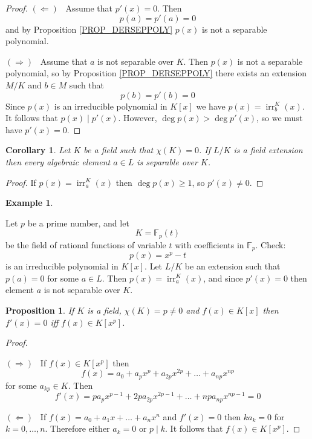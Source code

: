 \documentclass[12pt, letterpaper, oneside]{article}
\theoremstyle{plain}
\newtheorem{proposition}[theorem]{Proposition}
\newtheorem{corollary}[theorem]{Corollary}
\theoremstyle{definition}
\newtheorem{example}[theorem]{Example}
\newcommand{\F}{{\mathbb F}}
\newcommand{\irr}{\operatorname{irr}}
\newcommand{\vs}{\vskip 5mm}
\begin{document}
\vs


\begin{proof}
$(\Leftarrow)$ \  Assume that $p'(x) = 0$. Then 
$$p(a) = p'(a) = 0$$
and by Proposition \ref{PROP_DERSEPPOLY} $p(x)$ is not a  separable polynomial.

\vs 

$(\Rightarrow)$ \ Assume that $a$ is not separable over $K$. Then $p(x)$ is not 
a separable polynomial, so by Proposition  \ref{PROP_DERSEPPOLY} 
there exists an extension $M/K$ and $b\in M$ such that 
$$p(b) = p'(b) = 0$$
Since $p(x)$ is an irreducible polynomial in $K[x]$ we have $p(x) = \irr^{K}_{b}(x)$. 
It follows that $p(x) \mid p'(x) $. However, $\deg p(x) > \deg p'(x)$, so we must have 
$p'(x) = 0$. 


\end{proof}


\vs\vs

\begin{corollary}
\label{COR_CHARZEROSEPELTS}
Let $K$ be a field such that $\chi(K) = 0$. If $L/K$ is a field extension then 
every algebraic element $a\in L$ is separable over $K$. 
\end{corollary}

\vs 

\begin{proof}
If $p(x) = \irr^{K}_{a}(x)$ then $\deg p(x) \geq 1$, so $p'(x) \neq 0$. 
\end{proof}


\vs\vs


\begin{example}\ 

Let $p$ be a prime number, and let 
$$K = \F_{p}(t)$$ 
be the field of rational functions of variable $t$ with coefficients in $\F_{p}$. 
Check: 
$$p(x) = x^{p} - t$$ 
is an irreducible polynomial in $K[x]$. Let $L/K$
be an extension such that $p(a) = 0$ for some $a\in L$. Then $p(x) = \irr^{K}_{a}(x)$,
and since $p'(x) = 0$ then element $a$ is not separable over $K$.

\end{example}


\vs\vs


\begin{proposition}
\label{PROP_ZARODERXP}
 If $K$ is a field, $\chi(K) = p \neq 0$ and $f(x) \in K[x]$ then $f'(x) = 0$ iff
 $f(x) \in K[x^{p}]$.
\end{proposition}

\vs 

\begin{proof} \ 



$(\Rightarrow)$ \  If $f(x) \in K[x^{p}]$ then 
$$f(x) = a_{0} + a_{p}x^{p} + a_{2p}x^{2p} + {\dots} + a_{np}x^{np}$$
for some $a_{kp}\in K$. Then 
$$f'(x) = pa_{p}x^{p-1} + 2pa_{2p}x^{2p-1} + {\dots} + npa_{np}x^{np-1} = 0$$

\vs

$(\Leftarrow)$ \ If $f(x) = a_{0} + a_{1}x + {\dots} + a_{n}x^{n}$ and $f'(x) = 0$ then 
$ka_{k} = 0$ for $k=0, \dots, n$. Therefore either $a_{k} = 0$ or $p \mid k$. It follows that 
 $f(x)\in K[x^{p}]$. 

\end{proof}
\end{document}
